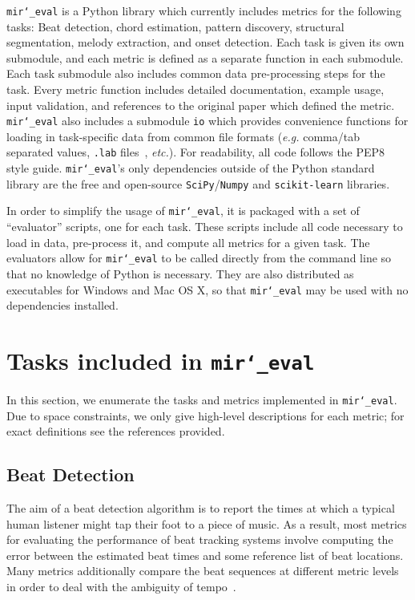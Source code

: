 \documentclass{article}
\def\eg{\emph{e.g.}}
\def\etc{\emph{etc.}}
\def\mireval{\texttt{mir\char`_eval}}
\begin{document}
\mireval{} is a Python library which currently includes metrics for the following tasks: Beat detection, chord estimation, pattern discovery, structural segmentation, melody extraction, and onset detection.
Each task is given its own submodule, and each metric is defined as a separate function in each submodule.
Each task submodule also includes common data pre-processing steps for the task.
Every metric function includes detailed documentation, example usage, input validation, and references to the original paper which defined the metric.
\mireval{} also includes a submodule \texttt{io} which provides convenience functions
for loading in task-specific data from common file formats (\eg{} comma/tab separated
    values, \texttt{.lab} files~\cite{harte2010towards}, \etc{}).
For readability, all code follows the PEP8 style guide\cite{van2001pep}.
\mireval{}'s only dependencies outside of the Python standard library are the free and open-source \texttt{SciPy}/\texttt{Numpy}\cite{jones2001scipy} and \texttt{scikit-learn}\cite{pedregosa2011scikit} libraries.

In order to simplify the usage of \mireval{}, it is packaged with a set of ``evaluator'' scripts, one for each task.
These scripts include all code necessary to load in data, pre-process it, and compute all metrics for a given task.
The evaluators allow for \mireval{} to be called directly from the command line so that no knowledge of Python is necessary.
They are also distributed as executables for Windows and Mac OS X, so that \mireval{} may be used with no dependencies installed.

\section{Tasks included in \mireval{}}
\label{sec:tasks}

In this section, we enumerate the tasks and metrics implemented in \mireval{}.
Due to space constraints, we only give high-level descriptions for each metric; for exact definitions see the references provided.

\subsection{Beat Detection}

The aim of a beat detection algorithm is to report the times at which a typical human listener might tap their foot to a piece of music.
As a result, most metrics for evaluating the performance of beat tracking systems involve computing the error between the estimated beat times and some reference list of beat locations.
Many metrics additionally compare the beat sequences at different metric levels in
order to deal with the ambiguity of tempo~\cite{davies2009evaluation}.
\end{document}

